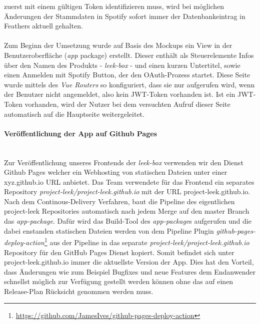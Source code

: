 \documentclass[10pt, a4paper]{article}
\begin{document}
zuerst  mit einem gültigen Token identifizieren muss, wird bei möglichen Änderungen der Stammdaten in Spotify sofort immer der Datenbankeintrag in Feathers
aktuell gehalten.
\\~\\
Zum Beginn der Umsetzung wurde auf Basis des Mockups ein View in der Benutzeroberfläche (\textit{app} package) erstellt. Dieser enthält als Steuerelemente Infos
über den Namen des Produkts - \textit{leek-box} - und einen kurzen Untertitel, sowie einen \glqq Anmelden mit Spotify\grqq{} Button, der den OAuth-Prozess startet.
Diese Seite wurde mittels des \textit{Vue Routers} so konfiguriert, dass sie nur aufgerufen wird, wenn der Benutzer nicht angemeldet, also kein JWT-Token
vorhanden ist. Ist ein JWT-Token vorhanden, wird der Nutzer bei dem versuchten Aufruf dieser Seite automatisch auf die Hauptseite weitergeleitet.

\paragraph*{Veröffentlichung der App auf Github Pages} $~$ \\
Zur Veröffentlichung unseres Frontends der \textit{leek-box} verwenden wir den Dienst Github Pages welcher ein Webhosting von statischen Dateien unter einer xyz.github.io URL anbietet.
Das Team verwendete für das Frontend ein separates Repository \textit{project-leek/project-leek.github.io} mit der URL project-leek.github.io.
Nach dem Continous-Delivery Verfahren, baut die Pipeline des eigentlichen project-leek Repositories automatisch nach jedem Merge auf den master Branch das \textit{app-package}.
Dafür wird das Build-Tool des \textit{app-package}s aufgerufen und die dabei enstanden statischen Dateien werden von dem Pipeline Plugin
\textit{github-pages-deploy-action}\footnote{\raggedright\url{https://github.com/JamesIves/github-pages-deploy-action}} aus der Pipeline in das separate
\textit{project-leek/project-leek.github.io} Repository für den GitHub Pages Dienst kopiert. Somit befindet sich unter project-leek.github.io immer die aktuellste Version der App.
Dies hat den Vorteil, dass Änderungen wie zum Beispiel Bugfixes und neue Features dem Endanwender schnellst möglich zur Verfügung gestellt werden können ohne das auf einen Release-Plan Rücksicht genommen werden muss.
\end{document}
